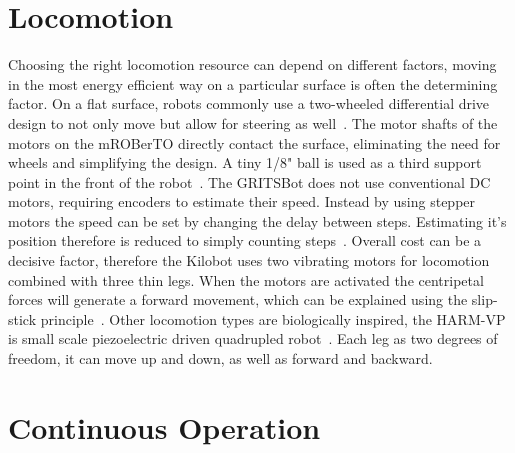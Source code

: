 
\section{Locomotion}
\label{sec:locomotion}

Choosing the right locomotion resource can depend on different factors, moving in the most energy efficient way on a particular surface is often the determining factor.
On a flat surface, robots commonly use a two-wheeled differential drive design to not only move but allow for steering as well~\cite{sabelhaus_icra_2013, pickem_icra_2015}.
The motor shafts of the motors on the mROBerTO directly contact the surface, eliminating the need for wheels and simplifying the design.
A tiny 1/8" ball is used as a third support point in the front of the robot~\cite{kim_iros_2016}.
The GRITSBot does not use conventional DC motors, requiring encoders to estimate their speed. 
Instead by using stepper motors the speed can be set by changing the delay between steps. 
Estimating it's position therefore is reduced to simply counting steps~\cite{pickem_icra_2015}.  
Overall cost can be a decisive factor, therefore the Kilobot uses two vibrating motors for locomotion combined with three thin legs.
When the motors are activated the centripetal forces will generate a forward movement, which can be explained using the slip-stick principle~\cite{rubenstein_icra_2012}.
Other locomotion types are biologically inspired, the HARM-VP is small scale piezoelectric driven quadrupled robot~\cite{baisch_iros_2013}.
Each leg as two degrees of freedom, it can move up and down, as well as forward and backward.

\section{Continuous Operation}
\label{sec:continous_operation}

